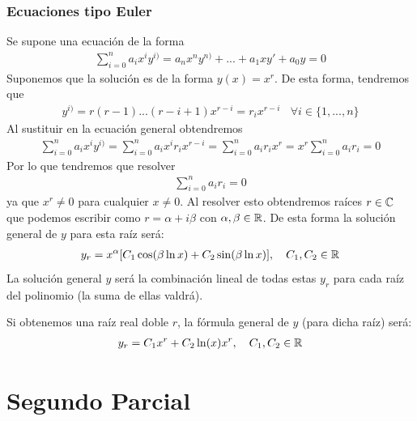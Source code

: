 \documentclass[12pt]{book}
\begin{document}
    \subsection{Ecuaciones tipo Euler}
    Se supone una ecuación de la forma 
    \begin{gather*}
        \sum_{i=0}^n a_i x^i y^{i)} = a_nx^ny^{n)} + ... + a_1x y' + a_0y = 0
    \end{gather*}
    Suponemos que la solución es de la forma $y(x)=x^r$. De esta forma, tendremos que 
    \begin{gather*}
        y^{i)} = r(r-1)...(r-i+1)x^{r-i} = r_ix^{r-i}\ \ \ \ \forall i \in \{1,...,n\}
    \end{gather*}
    Al sustituir en la ecuación general obtendremos
    \begin{gather*}
        \sum_{i=0}^n a_i x^i y^{i)} = \sum_{i=0}^n a_i x^i r_ix^{r-i} =  \sum_{i=0}^n a_i r_ix^{r} = x^r \sum_{i=0}^n a_i r_i = 0
    \end{gather*}
    Por lo que tendremos que resolver 
    \begin{gather*}
        \sum_{i=0}^n a_i r_i = 0
    \end{gather*}
    ya que $x^r \neq 0$ para cualquier $x\neq 0$. Al resolver esto obtendremos raíces $r\in \mathbb{C}$ que podemos escribir como $r=\alpha + i\beta$ con $\alpha, \beta \in \mathbb{R}$. De esta forma la solución general de $y$ para esta raíz será:
    \begin{gather*}
        y_r = x^\alpha [C_1 \cos(\beta \ln x) + C_2 \sin(\beta \ln x)],\ \ \ C_1, C_2\in \bb{R}
    \end{gather*}
    La solución general $y$ será la combinación lineal de todas estas $y_r$ para cada raíz del polinomio (la suma de ellas valdrá).

    Si obtenemos una raíz real doble $r$, la fórmula general de $y$ (para dicha raíz) será:
    \begin{gather*}
        y_r = C_1 x^r + C_2 \ln(x) x^r , \ \ \ C_1, C_2\in \mathbb{R}
    \end{gather*} 

    \chapter{Segundo Parcial}

\end{document}
